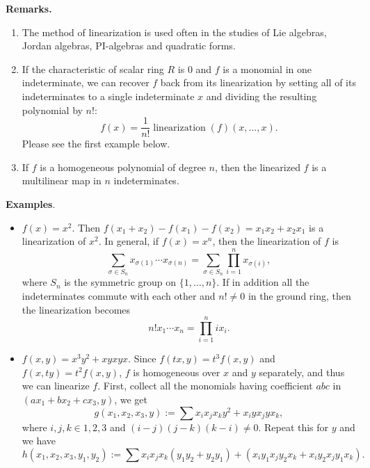 \documentclass[12pt]{article}
\begin{document}
\textbf{Remarks.}  
\begin{enumerate}
\item The method of linearization is used often in the studies of Lie algebras, Jordan algebras, PI-algebras and 
quadratic forms.
\item If the characteristic of scalar ring $R$ is 0 and $f$ is a monomial in one indeterminate, we can recover $f$ back 
from its linearization by setting all of its indeterminates to a single indeterminate $x$ and dividing the resulting 
polynomial by $n!$: $$f(x)=\frac{1}{n!}\operatorname{linearization}(f)(x,\ldots,x).$$  Please see the first example below.
\item If $f$ is a homogeneous polynomial of degree $n$, then the linearized $f$ is a multilinear map in $n$ 
indeterminates.
\end{enumerate}

\textbf{Examples}.
\begin{itemize}
\item $f(x)=x^2$.  Then $f(x_1+x_2)-f(x_1)-f(x_2)=x_1x_2+x_2x_1$ is a linearization of $x^2$.  In general, if $f(x)=x^n$, 
then the linearization of $f$ is $$\sum_{\sigma\in S_n}x_{\sigma(1)}\cdots x_{\sigma(n)}=
\sum_{\sigma\in S_n}\prod_{i=1}^{n}x_{\sigma(i)},$$ where $S_n$ is the symmetric group on $\lbrace1,\ldots,n\rbrace$.  
If in addition all the indeterminates commute with each other and $n!\neq0$ in the ground ring, then the linearization 
becomes $$n!x_1\cdots x_n=\prod_{i=1}^{n}ix_i.$$
\item $f(x,y)=x^3y^2+xyxyx$.  Since $f(tx,y)=t^3f(x,y)$ and $f(x,ty)=t^2f(x,y)$, $f$ is homogeneous over $x$ and $y$ 
separately, and thus we can linearize $f$.  First, collect all the monomials having coefficient $abc$ in 
$(ax_1+bx_2+cx_3,y)$, we get $$g(x_1,x_2,x_3,y):=\sum x_ix_jx_ky^2+x_iyx_jyx_k,$$ where $i,j,k\in 
{1,2,3}$ and $(i-j)(j-k)(k-i)\neq0$.  Repeat this for $y$ and we have 
$$h(x_1,x_2,x_3,y_1,y_2):=\sum x_ix_jx_k(y_1y_2+y_2y_1)+(x_iy_1x_jy_2x_k+x_iy_2x_jy_1x_k).$$
\end{itemize}
\end{document}

